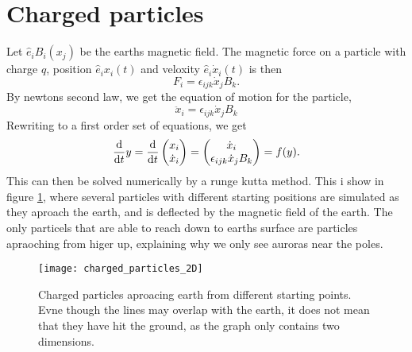 \documentclass{article}
\begin{document}
    \section*{Charged particles}
        Let $ \hat e_i B_i(x_j)$ be the earths magnetic field. The magnetic force on a particle with charge $q$, position $\hat e_i x_i(t)$ and veloxity $\hat e_i \dot x_i (t)$ is then
        \begin{equation}
            F_i = \epsilon_{ijk} \dot x_j B_k.
        \end{equation}
        By newtons second law, we get the equation of motion for the particle,
        \begin{equation}
            \ddot x_i = \epsilon_{ijk} \dot x_j B_k
        \end{equation}
        Rewriting to a first order set of equations, we get
        \begin{align*}
            \dv{t} y = \dv{t} 
            \begin{pmatrix}
                x_i \\
                \dot x_i
            \end{pmatrix}
            = 
            \begin{pmatrix}
                \dot x_i \\
                \epsilon_{ijk} \dot x_j B_k
            \end{pmatrix}
            = f(y).
        \end{align*}
        This can then be solved numerically by a runge kutta method. This i show in figure \ref{Charged particles}, where several particles with different starting positions are simulated as they aproach the earth, and is deflected by the magnetic field of the earth. The only particels that are able to reach down to earths surface are particles apraoching from higer up, explaining why we only see auroras near the poles.

        \begin{figure}
            \centering
            \vspace{-50px}
            \texttt{[image: charged\_particles\_2D]}
            \caption{Charged particles aproacing earth from different starting points. Evne though the lines may overlap with the earth, it does not mean that they have hit the ground, as the graph only contains two dimensions.}
            \label{Charged particles}
        \end{figure}
\end{document}

